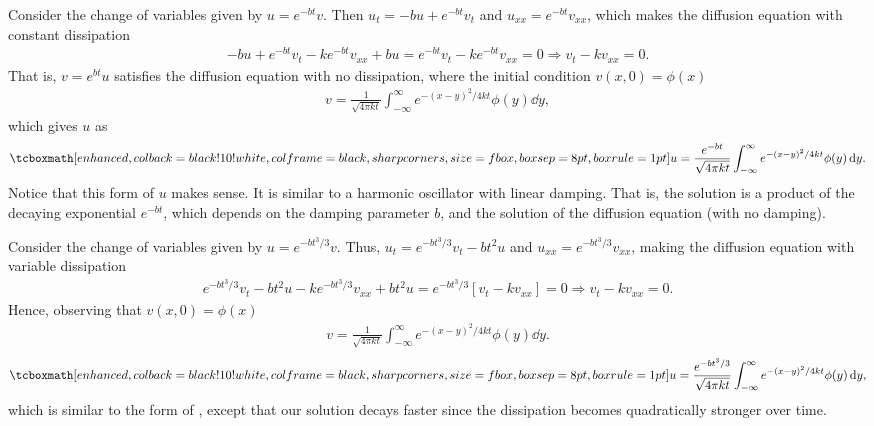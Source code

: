 \def\duedate{09/29/22}
\def\HWnum{4}



    

Consider the change of variables given by $u = e^{-bt}v$.
Then $u_{t} = -bu + e^{-bt}v_{t}$ and $u_{xx} = e^{-bt}v_{xx}$, which makes the diffusion equation with constant dissipation
\begin{eqnarray}
    \label{eq:heat-with-diss}
    -bu + e^{-bt}v_{t} - ke^{-bt}v_{xx} + bu = e^{-bt}v_{t} - ke^{-bt}v_{xx} = 0 \Rightarrow v_{t} - kv_{xx} = 0
.\end{eqnarray}
That is, $v = e^{bt}u$ satisfies the diffusion equation with no dissipation, where the initial condition $v(x,0) = \phi(x)$
\begin{eqnarray}
    \label{eq:v-constant-diss}
    v = \frac{1}{\sqrt{4 \pi k t}}\int_{-\infty}^{\infty} e^{-(x-y)^2/4kt}\phi(y) \dd{y}
,\end{eqnarray}
which gives $u$ as
\begin{eqnarray}
    \label{eq:u-from-v}
    \eqbox{
    u = \frac{e^{-bt}}{\sqrt{4 \pi k t}}\int_{-\infty}^{\infty} e^{-(x-y)^2/4kt} \phi(y) \dd{y}
}
.\end{eqnarray}
Notice that this form of $u$ makes sense.
It is similar to a harmonic oscillator with linear damping.
That is, the solution is a product of the decaying exponential $e^{-bt}$, which depends on the damping parameter $b$, and the solution of the diffusion equation (with no damping). 


Consider the change of variables given by $u = e^{-bt^3/3}v$.
Thus, $u_{t} = e^{-bt^3/3}v_{t} - bt^2u$ and $u_{xx} = e^{-bt^3/3}v_{xx}$, making the diffusion equation with variable dissipation
\begin{eqnarray}
    \label{eq:heat-with-var-diss}
    e^{-bt^3/3}v_{t} - bt^2u - ke^{-bt^3/3}v_{xx} + bt^2u = e^{-bt^3/3}[v_{t} - kv_{xx}] = 0 \Rightarrow v_{t} - kv_{xx} = 0
.\end{eqnarray}
Hence, observing that $v(x,0) = \phi(x)$
\begin{eqnarray}
    \label{eq:v-var-diss}
    v = \frac{1}{\sqrt{4 \pi k t}} \int_{-\infty}^{\infty} e^{-(x-y)^2/4kt}\phi(y) \dd{y}
.\end{eqnarray}
\begin{eqnarray}
    \label{eq:u-var-diss}
    \eqbox{
    u = \frac{e^{-bt^3/3}}{\sqrt{4 \pi k t}} \int_{-\infty}^{\infty} e^{-(x-y)^2/4kt} \phi(y) \dd{y}
}
,\end{eqnarray}
which is similar to the form of , except that our solution decays faster since the dissipation becomes quadratically stronger over time.


